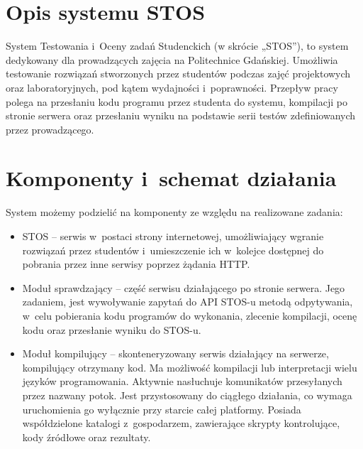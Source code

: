 \section{Opis systemu STOS}
\indent System Testowania i~Oceny zadań Studenckich (w skrócie „STOS”), to system dedykowany dla prowadzących zajęcia na Politechnice Gdańskiej. Umożliwia testowanie rozwiązań stworzonych przez studentów podczas zajęć projektowych oraz laboratoryjnych, pod kątem wydajności i~poprawności. Przepływ pracy polega na przesłaniu kodu programu przez studenta do systemu, kompilacji po stronie serwera oraz przesłaniu wyniku na podstawie serii testów zdefiniowanych przez prowadzącego.

\section{Komponenty i~schemat działania}
System możemy podzielić na komponenty ze względu na realizowane zadania:
\begin{itemize}
    \item STOS -- serwis w~postaci strony internetowej, umożliwiający wgranie rozwiązań przez studentów i~umieszczenie ich w~kolejce dostępnej do pobrania przez inne serwisy poprzez żądania HTTP.
    \item Moduł sprawdzający -- część serwisu działającego po stronie serwera. Jego zadaniem, jest wywoływanie zapytań do API STOS-u metodą odpytywania, w~celu pobierania kodu programów do wykonania, zlecenie kompilacji, ocenę kodu oraz przesłanie wyniku do STOS-u.
    \item Moduł kompilujący -- skonteneryzowany serwis działający na serwerze, kompilujący otrzymany kod. Ma możliwość kompilacji lub interpretacji wielu języków programowania. Aktywnie nasłuchuje komunikatów przesyłanych przez nazwany potok. Jest przystosowany do ciągłego działania, co wymaga uruchomienia go wyłącznie przy starcie całej platformy. Posiada współdzielone katalogi z~gospodarzem, zawierające skrypty kontrolujące, kody źródłowe oraz rezultaty.
\end{itemize}
